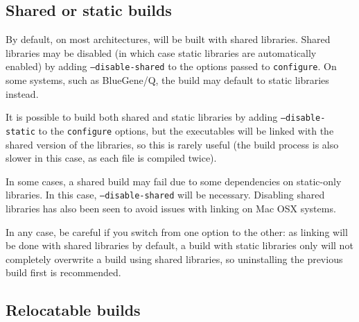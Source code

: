 \documentclass[a4paper,10pt,twoside]{csshortdoc}
\begin{document}

\subsection{Shared or static builds\label{sec:config:shared}}

By default, on most architectures, \CS will be built with shared libraries.
Shared libraries may be disabled (in which case static libraries
are automatically enabled) by adding  {\tt --disable-shared} to the options
passed to {\tt configure}.
On some systems, such as BlueGene/Q, the build may default to static libraries
instead.

It is possible to build both shared and static libraries by adding
{\tt --disable-static} to the {\tt configure} options, but the
executables will be linked with the shared version of the libraries,
so this is rarely useful (the build process is also slower in this case, as
each file is compiled twice).

In some cases, a shared build may fail due to some dependencies
on static-only libraries. In this case, {\tt --disable-shared}
will be necessary. Disabling shared libraries has also been seen
to avoid issues with linking on Mac OSX systems.

In any case, be careful if you switch from one option to the other: as
linking will be done with shared libraries by default, a build
with static libraries only will not completely overwrite a build using
shared libraries, so uninstalling the previous build first
is recommended.

\subsection{Relocatable builds\label{sec:config:relocatable}}
\end{document}
